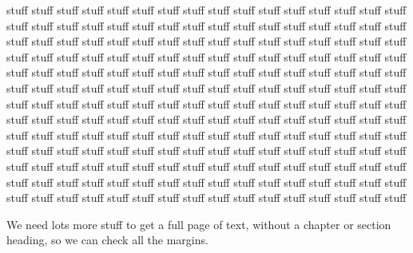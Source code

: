 \documentclass[
  dissertation]{bsu-cs}
\begin{document}
stuff stuff stuff stuff stuff stuff stuff stuff stuff stuff stuff stuff
stuff stuff stuff stuff stuff stuff stuff stuff stuff stuff stuff stuff
stuff stuff stuff stuff stuff stuff stuff stuff stuff stuff stuff stuff
stuff stuff stuff stuff stuff stuff stuff stuff stuff stuff stuff stuff
stuff stuff stuff stuff stuff stuff stuff stuff stuff stuff stuff stuff
stuff stuff stuff stuff stuff stuff stuff stuff stuff stuff stuff stuff
stuff stuff stuff stuff stuff stuff stuff stuff stuff stuff stuff stuff
stuff stuff stuff stuff stuff stuff stuff stuff stuff stuff stuff stuff
stuff stuff stuff stuff stuff stuff stuff stuff stuff stuff stuff stuff
stuff stuff stuff stuff stuff stuff stuff stuff stuff stuff stuff stuff
stuff stuff stuff stuff stuff stuff stuff stuff stuff stuff stuff stuff
stuff stuff stuff stuff stuff stuff stuff stuff stuff stuff stuff stuff
stuff stuff stuff stuff stuff stuff stuff stuff stuff stuff stuff stuff
stuff stuff stuff stuff stuff stuff stuff stuff stuff stuff stuff stuff
stuff stuff stuff stuff stuff stuff stuff stuff stuff stuff stuff stuff
stuff stuff stuff stuff stuff stuff stuff stuff stuff stuff stuff stuff
stuff stuff stuff stuff stuff stuff stuff stuff stuff stuff stuff stuff
stuff stuff stuff stuff

We need lots more stuff to get a full page of text, without a chapter or
section heading, so we can check all the margins.
\end{document}
